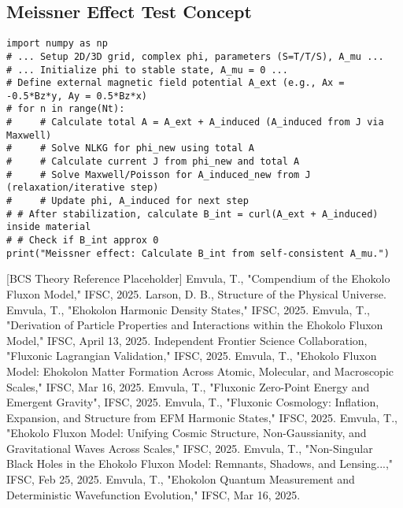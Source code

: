\documentclass[11pt]{article}
\begin{document}
\subsection{Meissner Effect Test Concept}
\begin{lstlisting}
import numpy as np
# ... Setup 2D/3D grid, complex phi, parameters (S=T/T/S), A_mu ...
# ... Initialize phi to stable state, A_mu = 0 ...
# Define external magnetic field potential A_ext (e.g., Ax = -0.5*Bz*y, Ay = 0.5*Bz*x)
# for n in range(Nt):
#     # Calculate total A = A_ext + A_induced (A_induced from J via Maxwell)
#     # Solve NLKG for phi_new using total A
#     # Calculate current J from phi_new and total A
#     # Solve Maxwell/Poisson for A_induced_new from J (relaxation/iterative step)
#     # Update phi, A_induced for next step
# # After stabilization, calculate B_int = curl(A_ext + A_induced) inside material
# # Check if B_int approx 0
print("Meissner effect: Calculate B_int from self-consistent A_mu.")
\end{lstlisting}


\begin{thebibliography}{99}
     [BCS Theory Reference Placeholder]
     Emvula, T., "Compendium of the Ehokolo Fluxon Model," IFSC, 2025.
     Larson, D. B., Structure of the Physical Universe.
     Emvula, T., "Ehokolon Harmonic Density States," IFSC, 2025.
     Emvula, T., "Derivation of Particle Properties and Interactions within the Ehokolo Fluxon Model," IFSC, April 13, 2025. %
     Independent Frontier Science Collaboration, "Fluxonic Lagrangian Validation," IFSC, 2025.
     Emvula, T., "Ehokolo Fluxon Model: Ehokolon Matter Formation Across Atomic, Molecular, and Macroscopic Scales," IFSC, Mar 16, 2025.
     Emvula, T., "Fluxonic Zero-Point Energy and Emergent Gravity", IFSC, 2025.
     Emvula, T., "Fluxonic Cosmology: Inflation, Expansion, and Structure from EFM Harmonic States," IFSC, 2025.
     Emvula, T., "Ehokolo Fluxon Model: Unifying Cosmic Structure, Non-Gaussianity, and Gravitational Waves Across Scales," IFSC, 2025.
     Emvula, T., "Non-Singular Black Holes in the Ehokolo Fluxon Model: Remnants, Shadows, and Lensing...," IFSC, Feb 25, 2025.
     Emvula, T., "Ehokolon Quantum Measurement and Deterministic Wavefunction Evolution," IFSC, Mar 16, 2025.


\end{thebibliography}
\end{document}
